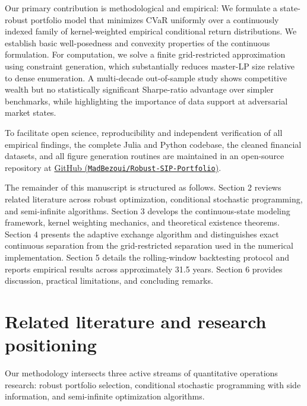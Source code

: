 \documentclass[11pt, a4paper]{article}
\begin{document}
Our primary contribution is methodological and empirical: We formulate a state-robust portfolio model that minimizes CVaR uniformly over a continuously indexed family of kernel-weighted empirical conditional return distributions. We establish basic well-posedness and convexity properties of the continuous formulation. For computation, we solve a finite grid-restricted approximation using constraint generation, which substantially reduces master-LP size relative to dense enumeration. A multi-decade out-of-sample study shows competitive wealth but no statistically significant Sharpe-ratio advantage over simpler benchmarks, while highlighting the importance of data support at adversarial market states.

To facilitate open science, reproducibility and independent verification of all empirical findings, the complete Julia and Python codebase, the cleaned financial datasets, and all figure generation routines are maintained in an open-source repository at \href{https://github.com/MadBezoui/Robust-SIP-Portfolio}{GitHub (\texttt{MadBezoui/Robust-SIP-Portfolio})}.

The remainder of this manuscript is structured as follows. Section 2 reviews related literature across robust optimization, conditional stochastic programming, and semi-infinite algorithms. Section 3 develops the continuous-state modeling framework, kernel weighting mechanics, and theoretical existence theorems. Section 4 presents the adaptive exchange algorithm and distinguishes exact continuous separation from the grid-restricted separation used in the numerical implementation. Section 5 details the rolling-window backtesting protocol and reports empirical results across approximately 31.5 years. Section 6 provides discussion, practical limitations, and concluding remarks.

\section{Related literature and research positioning}
Our methodology intersects three active streams of quantitative operations research: robust portfolio selection, conditional stochastic programming with side information, and semi-infinite optimization algorithms.
\end{document}
